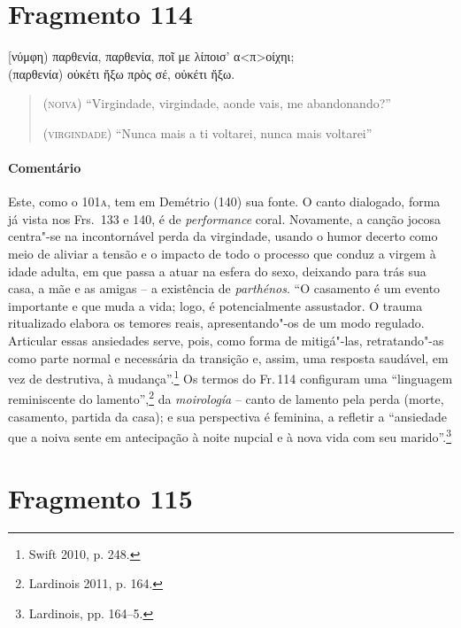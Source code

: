 {\pagebreak
\section{Fragmento 114}

\begin{gkverse}
[νύμφη) παρθενία, παρθενία, ποῖ με λίποισ’ α<π>οίχηι;\\
(παρθενία)  \dagger{}οὐκέτι ἤξω πρὸς σέ, οὐκέτι ἤξω\dagger{}.
\end{gkverse}

\begin{verse}
(\textsc{noiva}) ``Virgindade, virgindade, aonde vais, me abandonando?''

(\textsc{virgindade}) ``Nunca mais a ti voltarei, nunca mais voltarei''
\end{verse}

\medskip

{\paragraph{Comentário} Este, como o 101\textsc{a}, tem em Demétrio (140) sua fonte. O canto dialogado, forma já vista
nos Frs.~133 e 140, é de \textit{performance} coral. Novamente, a canção jocosa
centra"-se na incontornável perda da virgindade, usando o humor decerto como
meio de aliviar a tensão e o impacto de todo o processo que conduz a virgem à
idade adulta, em que passa a atuar na esfera do sexo, deixando para trás sua casa, a mãe e as amigas -- a existência de \textit{parthénos}.
``O casamento é um evento importante e que muda a vida; logo, é potencialmente assustador. O trauma ritualizado elabora os temores reais, apresentando"-os de um modo regulado. Articular essas ansiedades serve, pois, como forma de mitigá"-las, retratando"-as como parte normal e necessária da transição e, assim, uma resposta saudável, em vez de destrutiva, à mudança''.\footnote{Swift 2010, p. 248.}
Os termos do Fr.\,114 configuram uma ``linguagem reminiscente do lamento'',\footnote{Lardinois 2011, p. 164.} da \textit{moirología} -- canto de lamento pela perda (morte, casamento, partida da casa); e sua perspectiva é feminina, a refletir a ``ansiedade que a noiva sente em antecipação à noite nupcial e à nova vida com seu marido''.\footnote{Lardinois, pp. 164--5.}}



\pagebreak
\section{Fragmento 115}

}

